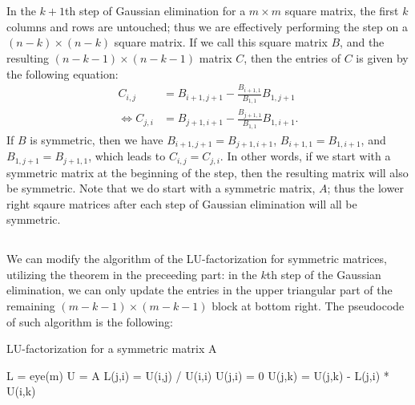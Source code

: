 \documentclass[11pt]{article}
\begin{document}
\maketitle
\section{}
\subsection{}
In the $k+1$th step of Gaussian elimination for a $m\times m$ square matrix, the first $k$ columns and rows are untouched; thus we are effectively performing the step on a $(n-k)\times(n-k)$ square matrix. If we call this square matrix $B$, and the resulting $(n-k-1)\times(n-k-1)$ matrix $C$, then the entries of $C$ is given by the following equation:
\begin{equation}\begin{split} 
C_{i,j}&=B_{i+1,j+1}-\frac{B_{i+1,1}}{B_{1,1}}B_{1,j+1}\\
\Leftrightarrow C_{j,i} &= B_{j+1,i+1} - \frac{B_{j+1,1}}{B_{1,1}}B_{1,i+1}.
\end{split}\nonumber\end{equation} 
If $B$ is symmetric, then we have $B_{i+1,j+1} = B_{j+1,i+1}$, $B_{i+1,1} = B_{1,i+1}$, and $B_{1,j+1} = B_{j+1,1}$, which leads to $C_{i,j} = C_{j,i}$. In other words, if we start with a symmetric matrix at the beginning of the step, then the resulting matrix will also be symmetric. Note that we do start with a symmetric matrix, $A$; thus the lower right sqaure matrices after each step of Gaussian elimination will all be symmetric.

\subsection{}
We can modify the algorithm of the LU-factorization for symmetric matrices, utilizing the theorem in the preceeding part: in the $k$th step of the Gaussian elimination, we can only update the entries in the upper triangular part of the remaining $(m-k-1)\times(m-k-1)$ block at bottom right. The pseudocode of such algorithm is the following:
\begin{algorithm}[H]
\caption{LU-factorization for a symmetric matrix A}
\begin{algorithmic}
	\STATE L = eye(m)
	\STATE U = A
			\STATE L(j,i) = U(i,j) / U(i,i)
			\STATE U(j,i) = 0
				\STATE U(j,k) = U(j,k) - L(j,i) * U(i,k)
			\ENDFOR
		\ENDFOR
    \ENDFOR
\end{algorithmic}
\end{algorithm}
\end{document}
